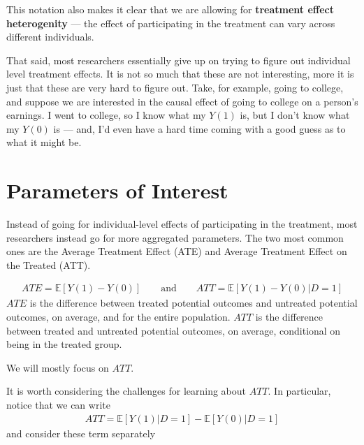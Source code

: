 \documentclass[
  letterpaper,
  DIV=11,
  numbers=noendperiod]{scrreprt}
\begin{document}
This notation also makes it clear that we are allowing for
\textbf{treatment effect heterogenity} --- the effect of participating
in the treatment can vary across different individuals.

That said, most researchers essentially give up on trying to figure out
individual level treatment effects. It is not so much that these are not
interesting, more it is just that these are very hard to figure out.
Take, for example, going to college, and suppose we are interested in
the causal effect of going to college on a person's earnings. I went to
college, so I know what my \(Y(1)\) is, but I don't know what my
\(Y(0)\) is --- and, I'd even have a hard time coming with a good guess
as to what it might be.

\section{Parameters of Interest}\label{parameters-of-interest}

Instead of going for individual-level effects of participating in the
treatment, most researchers instead go for more aggregated parameters.
The two most common ones are the Average Treatment Effect (ATE) and
Average Treatment Effect on the Treated (ATT).

\begin{align*}
  ATE = \mathbb{E}[Y(1) - Y(0)] \qquad \textrm{and} \qquad ATT = \mathbb{E}[Y(1)-Y(0) | D=1]
\end{align*} \(ATE\) is the difference between treated potential
outcomes and untreated potential outcomes, on average, and for the
entire population. \(ATT\) is the difference between treated and
untreated potential outcomes, on average, conditional on being in the
treated group.

We will mostly focus on \(ATT\).

It is worth considering the challenges for learning about \(ATT\). In
particular, notice that we can write \begin{align*}
  ATT = \mathbb{E}[Y(1)|D=1] - \mathbb{E}[Y(0)|D=1]
\end{align*} and consider these term separately
\end{document}
